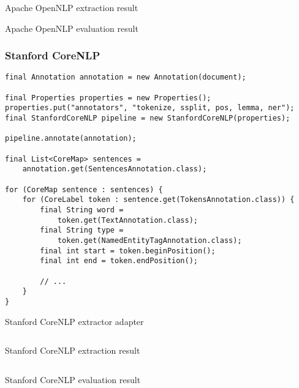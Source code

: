 \begin{listing}[H]
\inputminted{css}{opennlp.txt}
\caption{Apache OpenNLP extraction result}
\label{lst:opennlp-result}
\end{listing}

\begin{listing}[H]
\texttt{}
\caption{Apache OpenNLP evaluation result}
\end{listing}


\newpage
\subsubsection{Stanford CoreNLP}

\begin{listing}[H]
\begin{verbatim}
final Annotation annotation = new Annotation(document);

final Properties properties = new Properties();
properties.put("annotators", "tokenize, ssplit, pos, lemma, ner");
final StanfordCoreNLP pipeline = new StanfordCoreNLP(properties);

pipeline.annotate(annotation);

final List<CoreMap> sentences = 
    annotation.get(SentencesAnnotation.class);

for (CoreMap sentence : sentences) {
    for (CoreLabel token : sentence.get(TokensAnnotation.class)) {
        final String word = 
            token.get(TextAnnotation.class);
        final String type = 
            token.get(NamedEntityTagAnnotation.class);
        final int start = token.beginPosition();
        final int end = token.endPosition();

        // ...
    }
}
\end{verbatim}
\caption{Stanford CoreNLP extractor adapter}
\label{lst:corenlp-adapter}
\end{listing}

\begin{listing}[H]
\inputminted{xml}{corenlp.xml}
\caption{Stanford CoreNLP extraction result}
\label{lst:corenlp-result}
\end{listing}

\begin{listing}[H]
\inputminted{css}{corenlp.txt}
\caption{Stanford CoreNLP evaluation result}
\end{listing}

